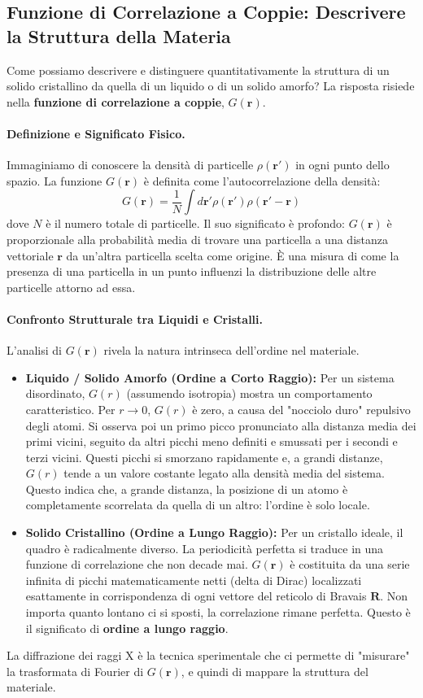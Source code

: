 \subsection{Funzione di Correlazione a Coppie: Descrivere la Struttura della Materia}
Come possiamo descrivere e distinguere quantitativamente la struttura di un solido cristallino da quella di un liquido o di un solido amorfo? La risposta risiede nella \textbf{funzione di correlazione a coppie}, \(G(\mathbf{r})\).

\paragraph{Definizione e Significato Fisico.}
Immaginiamo di conoscere la densità di particelle \(\rho(\mathbf{r'})\) in ogni punto dello spazio. La funzione \(G(\mathbf{r})\) è definita come l'autocorrelazione della densità:
\[ G(\mathbf{r}) = \frac{1}{N} \int d\mathbf{r'} \rho(\mathbf{r'}) \rho(\mathbf{r'} - \mathbf{r}) \]
dove \(N\) è il numero totale di particelle. Il suo significato è profondo: \(G(\mathbf{r})\) è proporzionale alla probabilità media di trovare una particella a una distanza vettoriale \(\mathbf{r}\) da un'altra particella scelta come origine. È una misura di come la presenza di una particella in un punto influenzi la distribuzione delle altre particelle attorno ad essa.

\paragraph{Confronto Strutturale tra Liquidi e Cristalli.}
L'analisi di \(G(\mathbf{r})\) rivela la natura intrinseca dell'ordine nel materiale.
\begin{itemize}
    \item \textbf{Liquido / Solido Amorfo (Ordine a Corto Raggio):} Per un sistema disordinato, \(G(r)\) (assumendo isotropia) mostra un comportamento caratteristico. Per \(r \to 0\), \(G(r)\) è zero, a causa del "nocciolo duro" repulsivo degli atomi. Si osserva poi un primo picco pronunciato alla distanza media dei primi vicini, seguito da altri picchi meno definiti e smussati per i secondi e terzi vicini. Questi picchi si smorzano rapidamente e, a grandi distanze, \(G(r)\) tende a un valore costante legato alla densità media del sistema. Questo indica che, a grande distanza, la posizione di un atomo è completamente scorrelata da quella di un altro: l'ordine è solo locale.
    \item \textbf{Solido Cristallino (Ordine a Lungo Raggio):} Per un cristallo ideale, il quadro è radicalmente diverso. La periodicità perfetta si traduce in una funzione di correlazione che non decade mai. \(G(\mathbf{r})\) è costituita da una serie infinita di picchi matematicamente netti (delta di Dirac) localizzati esattamente in corrispondenza di ogni vettore del reticolo di Bravais \(\mathbf{R}\). Non importa quanto lontano ci si sposti, la correlazione rimane perfetta. Questo è il significato di \textbf{ordine a lungo raggio}.
\end{itemize}
La diffrazione dei raggi X è la tecnica sperimentale che ci permette di "misurare" la trasformata di Fourier di \(G(\mathbf{r})\), e quindi di mappare la struttura del materiale.

